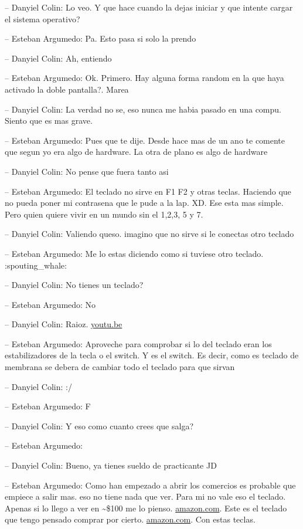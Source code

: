 -- Danyiel Colin: Lo veo. Y que hace cuando la dejas iniciar y que
intente cargar el sistema operativo?

-- Esteban Argumedo: Pa. Esto pasa si solo la prendo

-- Danyiel Colin: Ah, entiendo

-- Esteban Argumedo: Ok. Primero. Hay alguna forma random en la que haya
activado la doble pantalla?. Marea

-- Danyiel Colin: La verdad no se, eso nunca me habia pasado en una
compu. Siento que es mas grave.

-- Esteban Argumedo: Pues que te dije. Desde hace mas de un ano te
comente que segun yo era algo de hardware. La otra de plano es algo de
hardware

-- Danyiel Colin: No pense que fuera tanto asi

-- Esteban Argumedo: El teclado no sirve en F1 F2 y otras teclas.
Haciendo que no pueda poner mi contrasena que le pude a la lap. XD. Ese
esta mas simple. Pero quien quiere vivir en un mundo sin el 1,2,3, 5 y
7.

-- Danyiel Colin: Valiendo queso. imagino que no sirve si le conectas
otro teclado

-- Esteban Argumedo: Me lo estas diciendo como si tuviese otro teclado.
:spouting\_whale:

-- Danyiel Colin: No tienes un teclado?

-- Esteban Argumedo: No

-- Danyiel Colin: Raioz. \href{https://youtu.be/4ZK8Z8hulFg}{youtu.be}

-- Esteban Argumedo: Aproveche para comprobar si lo del teclado eran los
estabilizadores de la tecla o el switch. Y es el switch. Es decir, como
es teclado de membrana se debera de cambiar todo el teclado para que
sirvan

-- Danyiel Colin: :/

-- Esteban Argumedo: F

-- Danyiel Colin: Y eso como cuanto crees que salga?

-- Esteban Argumedo:

-- Danyiel Colin: Bueno, ya tienes sueldo de practicante JD

-- Esteban Argumedo: Como han empezado a abrir los comercios es probable
que empiece a salir mas. eso no tiene nada que ver. Para mi no vale eso
el teclado. Apenas si lo llego a ver en \textasciitilde\$100 me lo
pienso.
\href{https://www.amazon.com/RK-ROYAL-KLUDGE-Connectable-Hot-Swappable/dp/B08M3CRLGW/ref=sr_1_1_sspa?crid=35O02KG7UK9EX\&keywords=rk84\&qid=1648261344\&sprefix=rk84\%2Caps\%2C138\&sr=8-1-spons\&psc=1\&spLa=ZW5jcnlwdGVkUXVhbGlmaWVyPUExRU5HVUZSSkFEWEwxJmVuY3J5cHRlZElkPUEwMDQxMzIxVVhORUZTRDdJSTFIJmVuY3J5cHRlZEFkSWQ9QTAzOTEyMTA5V05UWlg3QVREQU0md2lkZ2V0TmFtZT1zcF9hdGYmYWN0aW9uPWNsaWNrUmVkaXJlY3QmZG9Ob3RMb2dDbGljaz10cnVl}{amazon.com}.
Este es el teclado que tengo pensado comprar por cierto.
\href{https://www.amazon.com/dp/B08T9GDHRJ/?coliid=I2GYVPTKW81ZVA\&colid=23QLVSC5CGW83\&psc=1\&ref_=lv_ov_lig_dp_it}{amazon.com}.
Con estas teclas.

